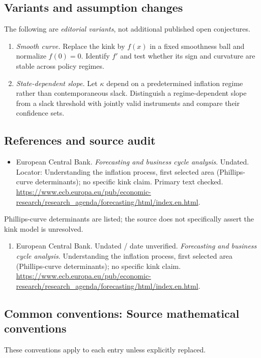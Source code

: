 \documentclass[11pt,a4paper]{article}
\begin{document}
\subsection*{Variants and assumption changes}
The following are \emph{editorial variants}, not additional published open conjectures.
\begin{enumerate}
\item \emph{Smooth curve.} Replace the kink by \(f(x)\) in a fixed smoothness ball and normalize \(f(0)=0\). Identify \(f'\) and test whether its sign and curvature are stable across policy regimes.
\item \emph{State-dependent slope.} Let \(\kappa\) depend on a predetermined inflation regime rather than contemporaneous slack. Distinguish a regime-dependent slope from a slack threshold with jointly valid instruments and compare their confidence sets.
\end{enumerate}
\subsection*{References and source audit}
\begin{itemize}
\item European Central Bank. \emph{Forecasting and business cycle analysis}. Undated. Locator: Understanding the inflation process, first selected area (Phillips-curve determinants); no specific kink claim. Primary text checked. \url{https://www.ecb.europa.eu/pub/economic-research/research_agenda/forecasting/html/index.en.html}.
\end{itemize}
Phillips-curve determinants are listed; the source does not specifically assert the kink model is unresolved.
\begin{enumerate}\raggedright
\item\hypertarget{definitions:source:30007523:1}{} European Central Bank. Undated / date unverified. \emph{Forecasting and business cycle analysis}. Understanding the inflation process, first selected area (Phillips-curve determinants); no specific kink claim.
\url{https://www.ecb.europa.eu/pub/economic-research/research_agenda/forecasting/html/index.en.html}.
\end{enumerate}

\subsection*{Common conventions: Source mathematical conventions}

These conventions apply to each entry unless explicitly replaced.
\end{document}
